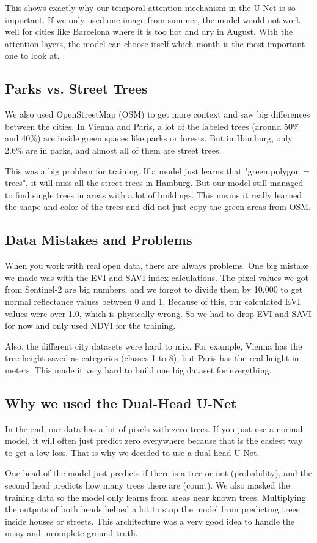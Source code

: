This shows exactly why our temporal attention mechanism in the U-Net is so important. If we only used one image from summer, the model would not work well for cities like Barcelona where it is too hot and dry in August. With the attention layers, the model can choose itself which month is the most important one to look at.

\subsection{Parks vs. Street Trees}

We also used OpenStreetMap (OSM) to get more context and saw big differences between the cities. In Vienna and Paris, a lot of the labeled trees (around 50\% and 40\%) are inside green spaces like parks or forests. But in Hamburg, only 2.6\% are in parks, and almost all of them are street trees. 

This was a big problem for training. If a model just learns that "green polygon = trees", it will miss all the street trees in Hamburg. But our model still managed to find single trees in areas with a lot of buildings. This means it really learned the shape and color of the trees and did not just copy the green areas from OSM.

\subsection{Data Mistakes and Problems}

When you work with real open data, there are always problems. One big mistake we made was with the EVI and SAVI index calculations. The pixel values we got from Sentinel-2 are big numbers, and we forgot to divide them by 10,000 to get normal reflectance values between 0 and 1. Because of this, our calculated EVI values were over 1.0, which is physically wrong. So we had to drop EVI and SAVI for now and only used NDVI for the training. 

Also, the different city datasets were hard to mix. For example, Vienna has the tree height saved as categories (classes 1 to 8), but Paris has the real height in meters. This made it very hard to build one big dataset for everything.

\subsection{Why we used the Dual-Head U-Net}

In the end, our data has a lot of pixels with zero trees. If you just use a normal model, it will often just predict zero everywhere because that is the easiest way to get a low loss. That is why we decided to use a dual-head U-Net. 

One head of the model just predicts if there is a tree or not (probability), and the second head predicts how many trees there are (count). We also masked the training data so the model only learns from areas near known trees. Multiplying the outputs of both heads helped a lot to stop the model from predicting trees inside houses or streets. This architecture was a very good idea to handle the noisy and incomplete ground truth.

